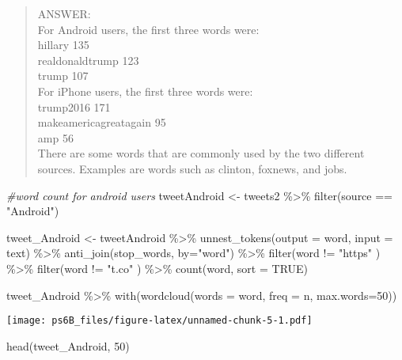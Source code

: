 \documentclass[
]{article}
\newenvironment{Shaded}{\begin{snugshade}}{\end{snugshade}}
\newcommand{\AttributeTok}[1]{\textcolor[rgb]{0.77,0.63,0.00}{#1}}
\newcommand{\CommentTok}[1]{\textcolor[rgb]{0.56,0.35,0.01}{\textit{#1}}}
\newcommand{\ConstantTok}[1]{\textcolor[rgb]{0.00,0.00,0.00}{#1}}
\newcommand{\DecValTok}[1]{\textcolor[rgb]{0.00,0.00,0.81}{#1}}
\newcommand{\FunctionTok}[1]{\textcolor[rgb]{0.00,0.00,0.00}{#1}}
\newcommand{\NormalTok}[1]{#1}
\newcommand{\OtherTok}[1]{\textcolor[rgb]{0.56,0.35,0.01}{#1}}
\newcommand{\SpecialCharTok}[1]{\textcolor[rgb]{0.00,0.00,0.00}{#1}}
\newcommand{\StringTok}[1]{\textcolor[rgb]{0.31,0.60,0.02}{#1}}
\begin{document}
\begin{quote}
ANSWER:\\
For Android users, the first three words were:\\
hillary 135\\
realdonaldtrump 123\\
trump 107\\
For iPhone users, the first three words were:\\
trump2016 171\\
makeamericagreatagain 95\\
amp 56\\
There are some words that are commonly used by the two different
sources. Examples are words such as clinton, foxnews, and jobs.
\end{quote}

\begin{Shaded}
\begin{Highlighting}[]
\CommentTok{\#word count for android users}
\NormalTok{tweetAndroid }\OtherTok{\textless{}{-}}\NormalTok{ tweets2 }\SpecialCharTok{\%\textgreater{}\%}
  \FunctionTok{filter}\NormalTok{(source }\SpecialCharTok{==} \StringTok{"Android"}\NormalTok{)}

\NormalTok{tweet\_Android }\OtherTok{\textless{}{-}}\NormalTok{ tweetAndroid }\SpecialCharTok{\%\textgreater{}\%}
  \FunctionTok{unnest\_tokens}\NormalTok{(}\AttributeTok{output =}\NormalTok{ word, }\AttributeTok{input =}\NormalTok{ text) }\SpecialCharTok{\%\textgreater{}\%}
  \FunctionTok{anti\_join}\NormalTok{(stop\_words, }\AttributeTok{by=}\StringTok{"word"}\NormalTok{) }\SpecialCharTok{\%\textgreater{}\%}
  \FunctionTok{filter}\NormalTok{(word }\SpecialCharTok{!=} \StringTok{"https"}\NormalTok{ ) }\SpecialCharTok{\%\textgreater{}\%}
  \FunctionTok{filter}\NormalTok{(word }\SpecialCharTok{!=} \StringTok{"t.co"}\NormalTok{ ) }\SpecialCharTok{\%\textgreater{}\%}
  \FunctionTok{count}\NormalTok{(word, }\AttributeTok{sort =} \ConstantTok{TRUE}\NormalTok{)}

\NormalTok{tweet\_Android }\SpecialCharTok{\%\textgreater{}\%}
  \FunctionTok{with}\NormalTok{(}\FunctionTok{wordcloud}\NormalTok{(}\AttributeTok{words =}\NormalTok{ word, }\AttributeTok{freq =}\NormalTok{ n, }\AttributeTok{max.words=}\DecValTok{50}\NormalTok{))}
\end{Highlighting}
\end{Shaded}

\texttt{[image: ps6B\_files/figure-latex/unnamed-chunk-5-1.pdf]}

\begin{Shaded}
\begin{Highlighting}[]
\FunctionTok{head}\NormalTok{(tweet\_Android, }\DecValTok{50}\NormalTok{)}
\end{Highlighting}
\end{Shaded}
\end{document}
